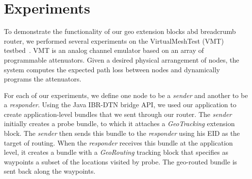 \section{Experiments}\label{sec:experiments}
To demonstrate the functionality of our geo extension blocks abd {\sc breadcrumb} router, we performed
several experiments on the VirtualMeshTest (VMT) testbed~\cite{hahn10:using}.
VMT is an analog channel
emulator based on an array of programmable attenuators.  Given a
desired physical arrangement of nodes, the system computes the
expected path loss between nodes and dynamically programs the attenuators.

For each of our experiments, we define one node to be a {\em
  sender} and another to be a {\em responder}. Using the Java IBR-DTN
bridge API, we used our application to create application-level
bundles that we sent through our router. The {\em sender} initially
creates a probe bundle, to which it attaches a {\em GeoTracking}
extension block. The {\em sender} then sends this bundle to the {\em
  responder} using his EID as the target of routing. When the {\em
  responder} receives this bundle at the application level, it creates
a bundle with a {\em GeoRouting} tracking block that specifies as
waypoints a subset of the locations visited by probe. The geo-routed
bundle is sent back along the waypoints.


